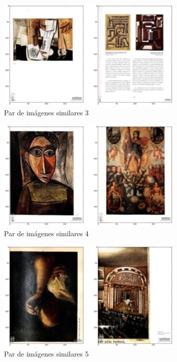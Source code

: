 \begin{figure}[H]
\centering
\includegraphics[width=0.8\textwidth]{Figures/similitud_3.png}
\caption{Par de imágenes similares 3}
\end{figure}

\begin{figure}[H]
\centering
\includegraphics[width=0.8\textwidth]{Figures/similitud_4.png}
\caption{Par de imágenes similares 4}
\end{figure}

\begin{figure}[H]
\centering
\includegraphics[width=0.8\textwidth]{Figures/similitud_5.png}
\caption{Par de imágenes similares 5}
\end{figure}

